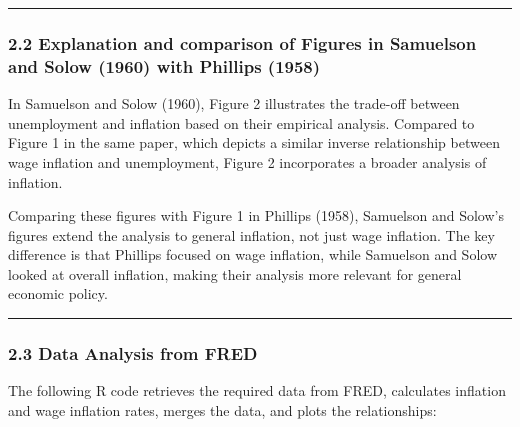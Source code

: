 \documentclass{article}
\begin{document}
\noindent\rule{\linewidth}{0.5pt}

\subsubsection*{2.2 Explanation and comparison of Figures in Samuelson and Solow (1960) with Phillips (1958)}

In Samuelson and Solow (1960), Figure 2 illustrates the trade-off between unemployment and inflation based on their empirical analysis. Compared to Figure 1 in the same paper, which depicts a similar inverse relationship between wage inflation and unemployment, Figure 2 incorporates a broader analysis of inflation.

Comparing these figures with Figure 1 in Phillips (1958), Samuelson and Solow's figures extend the analysis to general inflation, not just wage inflation. The key difference is that Phillips focused on wage inflation, while Samuelson and Solow looked at overall inflation, making their analysis more relevant for general economic policy.

\noindent\rule{\linewidth}{0.5pt}

\subsubsection*{2.3 Data Analysis from FRED}

The following R code retrieves the required data from FRED, calculates inflation and wage inflation rates, merges the data, and plots the relationships:
\end{document}
